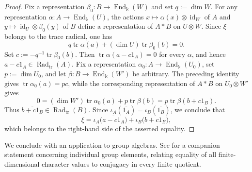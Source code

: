 \begin{proof}
    Fix a representation \(\beta_0\colon B\to\operatorname{End}_{\Bbbk}(W)\) and set \(q:=\dim W\).
    For any representation \(\alpha\colon A\to\operatorname{End}_{\Bbbk}(U)\), the actions \(x\mapsto\alpha(x)\otimes\operatorname{id}_W\) of \(A\) and \(y\mapsto\operatorname{id}_U\otimes\beta_0(y)\) of \(B\) define a representation of \(A*B\) on \(U\otimes W\).
    Since \(\xi\) belongs to the trace radical, one has
    \[
        q\operatorname{tr}\alpha(a)
        +(\dim U)\operatorname{tr}\beta_0(b)
        =0.
    \]
    Set \(c:=-q^{-1}\operatorname{tr}\beta_0(b)\).
    Then \(\operatorname{tr}\alpha(a-c1_A)=0\) for every \(\alpha\), and hence \(\overline{a-c1_A}\in\operatorname{Rad}_{\mathrm{tr}}(A)\).
    Fix a representation \(\alpha_0\colon A\to\operatorname{End}_{\Bbbk}(U_0)\), set \(p:=\dim U_0\), and let \(\beta\colon B\to\operatorname{End}_{\Bbbk}(W')\) be arbitrary.
    The preceding identity gives \(\operatorname{tr}\alpha_0(a)=pc\), while the corresponding representation of \(A*B\) on \(U_0\otimes W'\) gives
    \[
        0
        =(\dim W')\operatorname{tr}\alpha_0(a)
        +p\operatorname{tr}\beta(b)
        =p\operatorname{tr}\beta(b+c1_B).
    \]
    Thus \(\overline{b+c1_B}\in\operatorname{Rad}_{\mathrm{tr}}(B)\).
    Since \(\iota_A(\overline{1_A})=\iota_B(\overline{1_B})\), we conclude that
    \[
        \xi
        =\iota_A\bigl(\overline{a-c1_A}\bigr)
        +\iota_B\bigl(\overline{b+c1_B}\bigr),
    \]
    which belongs to the right-hand side of the asserted equality.
\end{proof}


We conclude with an application to group algebras. See \cite[Proposition~3.1]{BassLubotzky1983} for a companion statement concerning individual group elements, relating equality of all finite-dimensional character values to conjugacy in every finite quotient.

